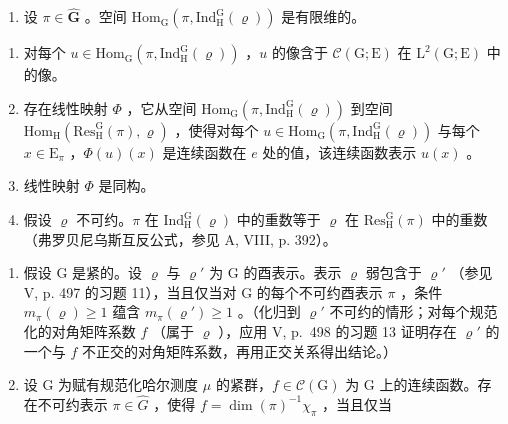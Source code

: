 \begin{enumerate}
\def\labelenumi{\alph{enumi})}
\tightlist
\item
  设 \(\pi \in \widehat{\mathbf{G}}\) 。空间 \(\mathrm{Hom}_{\mathrm{G}}(\pi, \mathrm{Ind}_{\mathrm{H}}^{\mathrm{G}}(\varrho))\) 是有限维的。

\end{enumerate}

\begin{enumerate}
\def\labelenumi{\alph{enumi})}
\setcounter{enumi}{1}
\item
  对每个 \(u \in \mathrm{Hom}_{\mathrm{G}}(\pi, \mathrm{Ind}_{\mathrm{H}}^{\mathrm{G}}(\varrho))\) ，\(u\) 的像含于 \(\mathcal{C}(\mathrm{G};\mathrm{E})\) 在 \(\mathrm{L}^2 (\mathrm{G};\mathrm{E})\) 中的像。
\item
  存在线性映射 \(\Phi\) ，它从空间 \(\mathrm{Hom}_{\mathrm{G}}(\pi, \mathrm{Ind}_{\mathrm{H}}^{\mathrm{G}}(\varrho))\) 到空间 \(\mathrm{Hom}_{\mathrm{H}}(\mathrm{Res}_{\mathrm{H}}^{\mathrm{G}}(\pi), \varrho)\) ，使得对每个 \(u \in \mathrm{Hom}_{\mathrm{G}}(\pi, \mathrm{Ind}_{\mathrm{H}}^{\mathrm{G}}(\varrho))\) 与每个 \(x \in \mathrm{E}_{\pi}\) ，\(\Phi(u)(x)\) 是连续函数在 \(e\) 处的值，该连续函数表示 \(u(x)\) 。
\item
  线性映射 \(\Phi\) 是同构。
\item
  假设 \(\varrho\) 不可约。\(\pi\) 在 \(\mathrm{Ind}_{\mathrm{H}}^{\mathrm{G}}(\varrho)\) 中的重数等于 \(\varrho\) 在 \(\mathrm{Res}_{\mathrm{H}}^{\mathrm{G}}(\pi)\) 中的重数（弗罗贝尼乌斯互反公式，参见 A, VIII, p. 392）。
\end{enumerate}

\begin{enumerate}
\def\labelenumi{\arabic{enumi})}
\setcounter{enumi}{17}
\item
  假设 G 是紧的。设 \(\varrho\) 与 \(\varrho'\) 为 G 的酉表示。表示 \(\varrho\) 弱包含于 \(\varrho'\) （参见 V, p. 497 的习题 11），当且仅当对 G 的每个不可约酉表示 \(\pi\) ，条件 \(m_{\pi}(\varrho) \geqslant 1\) 蕴含 \(m_{\pi}(\varrho') \geqslant 1\) 。（化归到 \(\varrho'\) 不可约的情形；对每个规范化的对角矩阵系数 \(f\) （属于 \(\varrho\) ），应用 V, p.~498 的习题 13 证明存在 \(\varrho'\) 的一个与 \(f\) 不正交的对角矩阵系数，再用正交关系得出结论。）
\item
  设 G 为赋有规范化哈尔测度 \(\mu\) 的紧群，\(f \in \mathcal{C}(\mathrm{G})\) 为 G 上的连续函数。存在不可约表示 \(\pi \in \widehat{G}\) ，使得 \(f = \dim(\pi)^{-1}\chi_{\pi}\) ，当且仅当
\end{enumerate}

